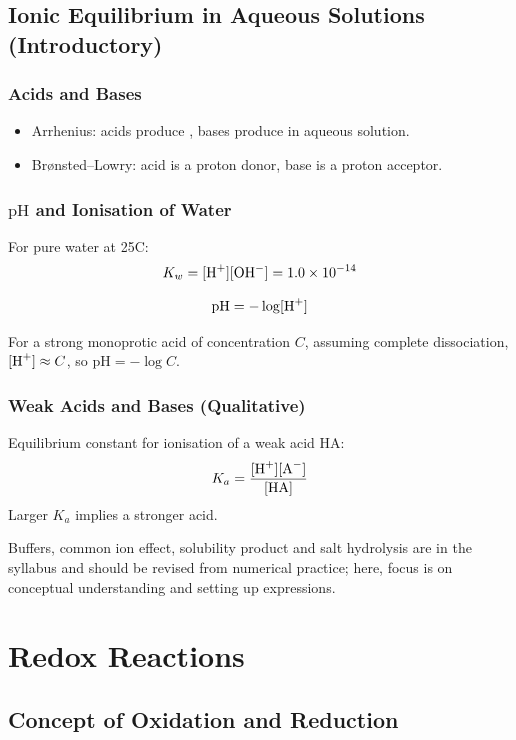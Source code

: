 \documentclass[12pt,a4paper]{article}
\begin{document}
\subsection{Ionic Equilibrium in Aqueous Solutions (Introductory)}

\subsubsection{Acids and Bases}
\begin{itemize}
    \item Arrhenius: acids produce , bases produce  in aqueous solution.
    \item Brønsted–Lowry: acid is a proton donor, base is a proton acceptor.
\end{itemize}

\subsubsection{\texorpdfstring{$\mathrm{pH}$}{pH} and Ionisation of Water}
For pure water at 25\degree C:
\[
K_w = [\ce{H^+}][\ce{OH^-}] = 1.0 \times 10^{-14}
\]

\[
\mathrm{pH} = -\log[\ce{H^+}]
\]

For a strong monoprotic acid of concentration $C$, assuming complete dissociation, $[\ce{H^+}] \approx C$, so $\mathrm{pH} = -\log C$.

\subsubsection{Weak Acids and Bases (Qualitative)}
Equilibrium constant for ionisation of a weak acid HA:
\[
K_a = \frac{[\ce{H^+}][\ce{A^-}]}{[\ce{HA}]}
\]
Larger $K_a$ implies a stronger acid.

Buffers, common ion effect, solubility product and salt hydrolysis are in the syllabus and should be revised from numerical practice; here, focus is on conceptual understanding and setting up expressions.

\clearpage


\section{Redox Reactions}

\subsection{Concept of Oxidation and Reduction}
\end{document}

